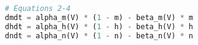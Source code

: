 \begin{lstlisting}[language=Python, caption={Python implementation of the Hodgkin-Huxley neuron's second, third and fourth equation}, label={lst:hodgkin-huxleymodelLst02-04}]
# Equations 2-4
dmdt = alpha_m(V) * (1 - m) - beta_m(V) * m
dhdt = alpha_h(V) * (1 - h) - beta_h(V) * h
dndt = alpha_n(V) * (1 - n) - beta_n(V) * n
\end{lstlisting}